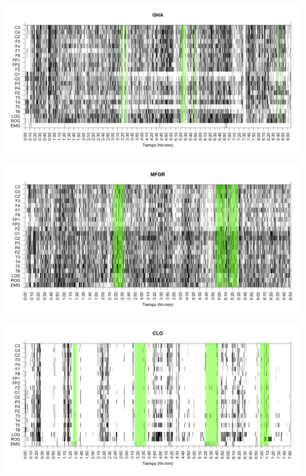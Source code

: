 
\begin{SidewaysFigure}
\centering
\includegraphics[width=\linewidth]
{./grafiquitos170404/GH24031950SUENO_est.png} 
\caption{Sujeto: GHA | Total \'epocas: 3281 | \'Epocas MOR: 134
}
\label{GHA}
\end{SidewaysFigure}


\begin{SidewaysFigure}
\centering
\includegraphics[width=\linewidth]
{./grafiquitos170404/GURM251148SUE_est.png} 
\caption{Sujeto: MFGR | Total \'epocas: 2466 | \'Epocas MOR: 267
}
\label{MHGR}
\end{SidewaysFigure}


\begin{SidewaysFigure}
\centering
\includegraphics[width=\linewidth]
{./grafiquitos170404/CLMN10SUE_est.png} 
\caption{Sujeto: CLO | Total \'epocas: 944 | \'Epocas MOR: 132
}
\label{CLO}
\end{SidewaysFigure}

